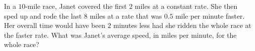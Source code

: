 In a $10$-mile race, Janet covered the first $2$ miles at a constant rate. She then sped up and rode the last $8$ miles at a rate that was $0.5$ mile per minute faster. Her overall time would have been $2$ minutes less had she ridden the whole race at the faster rate. What was Janet's average speed, in miles per minute, for the whole race?
